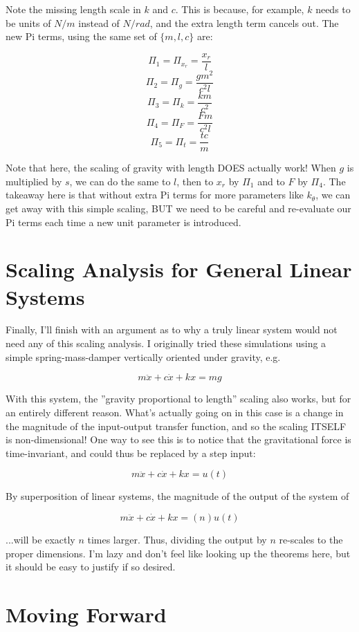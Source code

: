 \documentclass[12pt,letterpaper]{article}
\begin{document}
Note the missing length scale in $k$ and $c$. 
This is because, for example, $k$ needs to be units of $N/m$ instead of $N/rad$, and the extra length term cancels out.
The new Pi terms, using the same set of $\{m,l,c\}$ are:

\[
\Pi_1 = \Pi_{x_r} = \frac{x_r}{l}
\]
\[
\Pi_2 = \Pi_{g} = \frac{gm^2}{c^2l}
\]
\[
\Pi_3 = \Pi_{k} = \frac{km}{c^2}
\]
\[
\Pi_4 = \Pi_{F} = \frac{Fm}{c^2l}
\]
\[
\Pi_5 = \Pi_{t} = \frac{tc}{m}
\]

Note that here, the scaling of gravity with length DOES actually work!
When $g$ is multiplied by $s$, we can do the same to $l$, then to $x_r$ by $\Pi_1$ and to $F$ by $\Pi_4$.
The takeaway here is that without extra Pi terms for more parameters like $k_{\theta}$, we can get away with this simple scaling, BUT we need to be careful and re-evaluate our Pi terms each time a new unit parameter is introduced.

\section{Scaling Analysis for General Linear Systems}

Finally, I'll finish with an argument as to why a truly linear system would not need any of this scaling analysis.
I originally tried these simulations using a simple spring-mass-damper vertically oriented under gravity, e.g.

\[
m \ddot x + c \dot x + k x = mg
\]

With this system, the ''gravity proportional to length'' scaling also works, but for an entirely different reason.
What's actually going on in this case is a change in the magnitude of the input-output transfer function, and so the scaling ITSELF is non-dimensional!
One way to see this is to notice that the gravitational force is time-invariant, and could thus be replaced by a step input:

\[
m \ddot x + c \dot x + k x = u(t)
\]

By superposition of linear systems, the magnitude of the output of the system of

\[
m \ddot x + c \dot x + k x = (n) u(t)
\]

...will be exactly $n$ times larger. Thus, dividing the output by $n$ re-scales to the proper dimensions.
I'm lazy and don't feel like looking up the theorems here, but it should be easy to justify if so desired.

\section{Moving Forward}
\end{document}
